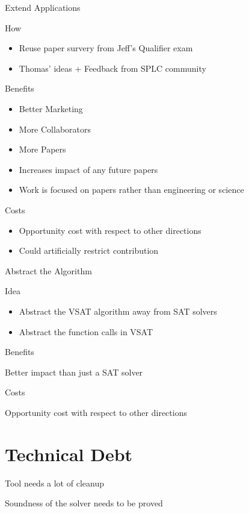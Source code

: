 \documentclass[presentation]{beamer}
\begin{document}
\begin{frame}[label={sec:org3be4787}]{Extend Applications}
\begin{block}{How}
\begin{itemize}
\item Reuse paper survery from Jeff's Qualifier exam

\item Thomas' ideas + Feedback from SPLC community
\end{itemize}
\end{block}

\begin{block}{Benefits}
\begin{itemize}
\item Better Marketing
\item More Collaborators
\item More Papers
\item Increases impact of any future papers
\item Work is focused on papers rather than engineering or science
\end{itemize}
\end{block}


\begin{block}{Costs}
\begin{itemize}
\item Opportunity cost with respect to other directions
\item Could artificially restrict contribution
\end{itemize}
\end{block}
\end{frame}

\begin{frame}[label={sec:org49108d5}]{Abstract the Algorithm}
\begin{block}{Idea}
\begin{itemize}
\item Abstract the VSAT algorithm away from SAT solvers
\item Abstract the function calls in VSAT
\end{itemize}
\end{block}


\begin{block}{Benefits}
\begin{block}{Better impact than just a SAT solver}
\end{block}
\end{block}

\begin{block}{Costs}
\begin{block}{Opportunity cost with respect to other directions}
\end{block}
\end{block}
\end{frame}

\section{Technical Debt}
\label{sec:org07223f8}

\begin{block}{Tool needs a lot of cleanup}
\end{block}

\begin{block}{Soundness of the solver needs to be proved}
\end{block}
\end{document}
